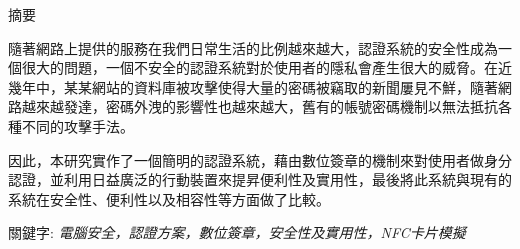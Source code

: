 

\doublespacing

%
\onehalfspacing

\begin{titlepage}
\begin{CJK}{UTF8}{bkai}
\begin{center}
\Large{{摘要}}\\
\end{center}

隨著網路上提供的服務在我們日常生活的比例越來越大，認證系統的安全性成為一個很大的問題，一個不安全的認證系統對於使用者的隱私會產生很大的威脅。在近幾年中，某某網站的資料庫被攻擊使得大量的密碼被竊取的新聞屢見不鮮，隨著網路越來越發達，密碼外洩的影響性也越來越大，舊有的帳號密碼機制以無法抵抗各種不同的攻擊手法。

因此，本研究實作了一個簡明的認證系統，藉由數位簽章的機制來對使用者做身分認證，並利用日益廣泛的行動裝置來提昇便利性及實用性，最後將此系統與現有的系統在安全性、便利性以及相容性等方面做了比較。

\vspace*{5em}

{關鍵字:} \emph{電腦安全，認證方案，數位簽章，安全性及實用性，NFC卡片模擬}


\end{CJK}
\end{titlepage}

%
